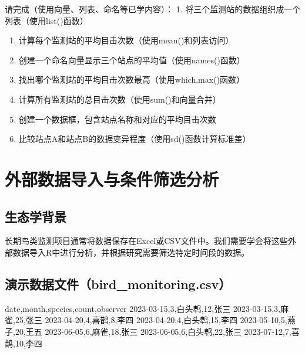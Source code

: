 \documentclass[
]{book}
\newenvironment{Shaded}{\begin{snugshade}}{\end{snugshade}}
\newcommand{\NormalTok}[1]{#1}
\begin{document}
请完成（使用向量、列表、命名等已学内容）：
1. 将三个监测站的数据组织成一个列表（使用list()函数）

\begin{enumerate}
\def\labelenumi{\arabic{enumi}.}
\setcounter{enumi}{1}
\item
  计算每个监测站的平均目击次数（使用mean()和列表访问）
\item
  创建一个命名向量显示三个站点的平均值（使用names()函数）
\item
  找出哪个监测站的平均目击次数最高（使用which.max()函数）
\item
  计算所有监测站的总目击次数（使用sum()和向量合并）
\item
  创建一个数据框，包含站点名称和对应的平均目击次数
\item
  比较站点A和站点B的数据变异程度（使用sd()函数计算标准差）
\end{enumerate}

\hypertarget{ux5916ux90e8ux6570ux636eux5bfcux5165ux4e0eux6761ux4ef6ux7b5bux9009ux5206ux6790}{%
\section{外部数据导入与条件筛选分析}\label{ux5916ux90e8ux6570ux636eux5bfcux5165ux4e0eux6761ux4ef6ux7b5bux9009ux5206ux6790}}

\hypertarget{ux751fux6001ux5b66ux80ccux666f-4}{%
\subsection{生态学背景}\label{ux751fux6001ux5b66ux80ccux666f-4}}

长期鸟类监测项目通常将数据保存在Excel或CSV文件中。我们需要学会将这些外部数据导入R中进行分析，并根据研究需要筛选特定时间段的数据。

\hypertarget{ux6f14ux793aux6570ux636eux6587ux4ef6bird_monitoring.csv}{%
\subsection{演示数据文件（bird\_monitoring.csv）}\label{ux6f14ux793aux6570ux636eux6587ux4ef6bird_monitoring.csv}}

\begin{Shaded}
\begin{Highlighting}[]
\NormalTok{date,month,species,count,observer}
\NormalTok{2023{-}03{-}15,3,白头鹎,12,张三}
\NormalTok{2023{-}03{-}15,3,麻雀,25,张三}
\NormalTok{2023{-}04{-}20,4,喜鹊,8,李四}
\NormalTok{2023{-}04{-}20,4,白头鹎,15,李四}
\NormalTok{2023{-}05{-}10,5,燕子,20,王五}
\NormalTok{2023{-}06{-}05,6,麻雀,18,张三}
\NormalTok{2023{-}06{-}05,6,白头鹎,22,张三}
\NormalTok{2023{-}07{-}12,7,喜鹊,10,李四}
\end{Highlighting}
\end{Shaded}
\end{document}
